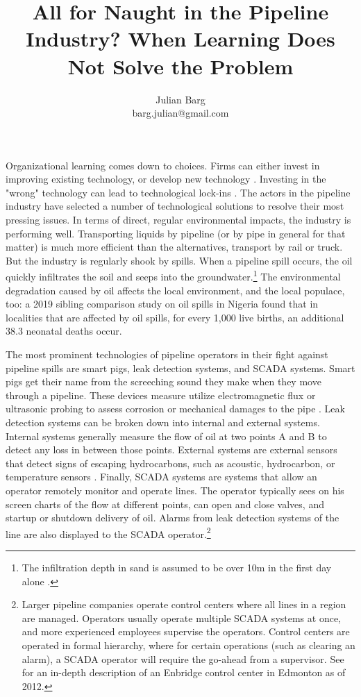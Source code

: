 \documentclass[12pt, man, natbib]{apa6}
\title{All for Naught in the Pipeline Industry? When Learning Does Not Solve the Problem}
\author{Julian Barg\\barg.julian@gmail.com}
\affiliation{Ivey Business School}
\begin{document}
	
	\maketitle
	
	\singlespacing
	
	\section{}
	
	Organizational learning comes down to choices. Firms can either invest in improving existing technology, or develop new technology \citep{March1991}. Investing in the "wrong" technology can lead to technological lock-ins \citep{Levinthal1993}. The actors in the pipeline industry have selected a number of technological solutions to resolve their most pressing issues. In terms of direct, regular environmental impacts, the industry is performing well. Transporting liquids by pipeline (or by pipe in general for that matter) is much more efficient than the alternatives, transport by rail or truck. But the industry is regularly shook by spills. When a pipeline spill occurs, the oil quickly infiltrates the soil and seeps into the groundwater.\footnote{The infiltration depth in sand is assumed to be over 10m in the first day alone \citep{Bonvicini2015}.} The environmental degradation caused by oil affects the local environment, and the local populace, too: a 2019 sibling comparison study on oil spills in Nigeria found that in localities that are affected by oil spills, for every 1,000 live births, an additional 38.3 neonatal deaths occur\citep{Bruederle2019}.
	
	The most prominent technologies of pipeline operators in their fight against pipeline spills are smart pigs, leak detection systems, and SCADA systems. Smart pigs get their name from the screeching sound they make when they move through a pipeline. These devices measure utilize electromagnetic flux or ultrasonic probing to assess corrosion or mechanical damages to the pipe \citep{Singh2017-7}. Leak detection systems can be broken down into internal and external systems. Internal systems generally measure the flow of oil at two points A and B to detect any loss in between those points. External systems are external sensors that detect signs of escaping hydrocarbons, such as acoustic, hydrocarbon, or temperature sensors \citep{Shaw2012}. Finally, SCADA systems are systems that allow an operator remotely monitor and operate lines. The operator typically sees on his screen charts of the flow at different points, can open and close valves, and startup or shutdown delivery of oil. Alarms from leak detection systems of the line are also displayed to the SCADA operator.\footnote{Larger pipeline companies operate control centers where all lines in a region are managed. Operators usually operate multiple SCADA systems at once, and more experienced employees supervise the operators. Control centers are operated in formal hierarchy, where for certain operations (such as clearing an alarm), a SCADA operator will require the go-ahead from a supervisor. See \citet{NTSB2012} for an in-depth description of an Enbridge control center in Edmonton as of 2012.}
\end{document}
